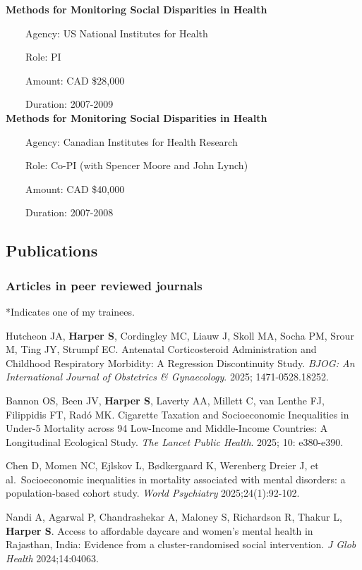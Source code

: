 \documentclass[
  letterpaper,
  DIV=11,
  numbers=noendperiod]{scrartcl}
\begin{document}
\textbf{Methods for Monitoring Social Disparities in Health}\\
\strut ~~~~Agency: US National Institutes for Health\\
\strut ~~~~Role: PI\\
\strut ~~~~Amount: CAD \$28,000\\
\strut ~~~~Duration: 2007-2009\\

\textbf{Methods for Monitoring Social Disparities in Health}\\
\strut ~~~~Agency: Canadian Institutes for Health Research\\
\strut ~~~~Role: Co-PI (with Spencer Moore and John Lynch)\\
\strut ~~~~Amount: CAD \$40,000\\
\strut ~~~~Duration: 2007-2008\\

\subsection{Publications}\label{publications}

\subsubsection{Articles in peer reviewed
journals}\label{articles-in-peer-reviewed-journals}

*Indicates one of my trainees.

Hutcheon JA, \textbf{Harper S}, Cordingley MC, Liauw J, Skoll MA, Socha
PM, Srour M, Ting JY, Strumpf EC. Antenatal Corticosteroid
Administration and Childhood Respiratory Morbidity: A Regression
Discontinuity Study. \emph{BJOG: An International Journal of Obstetrics
\& Gynaecology}. 2025; 1471-0528.18252.

Bannon OS, Been JV, \textbf{Harper S}, Laverty AA, Millett C, van Lenthe
FJ, Filippidis FT, Radó MK. Cigarette Taxation and Socioeconomic
Inequalities in Under-5 Mortality across 94 Low-Income and Middle-Income
Countries: A Longitudinal Ecological Study. \emph{The Lancet Public
Health}. 2025; 10: e380-e390.

Chen D, Momen NC, Ejlskov L, Bødkergaard K, Werenberg Dreier J, et
al.~Socioeconomic inequalities in mortality associated with mental
disorders: a population‐based cohort study. \emph{World Psychiatry}
2025;24(1):92-102.

Nandi A, Agarwal P, Chandrashekar A, Maloney S, Richardson R, Thakur L,
\textbf{Harper S}. Access to affordable daycare and women's mental
health in Rajasthan, India: Evidence from a cluster-randomised social
intervention. \emph{J Glob Health} 2024;14:04063.
\end{document}
